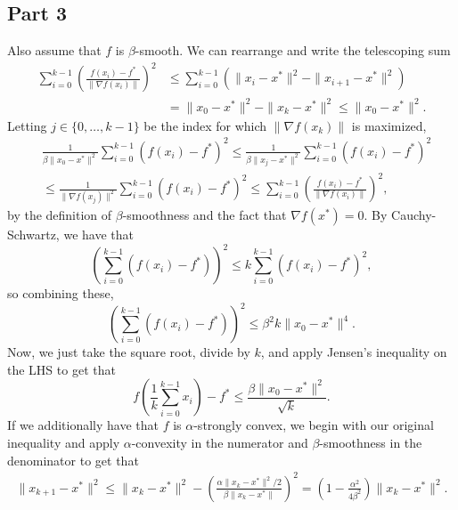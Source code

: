 \documentclass{article}
\begin{document}
\subsection{Part 3}
Also assume that $f$ is $\beta$-smooth.
We can rearrange and write the telescoping sum
\begin{align*}
\sum_{i=0}^{k-1}\left(\frac{f(x_i)-f^*}{\|\nabla f(x_i)\|}\right)^2&\leq\sum_{i=0}^{k-1}\left(\|x_{i}-x^*\|^2-\|x_{i+1}-x^*\|^2\right)\\&=
\|x_{0}-x^*\|^2-\|x_{k}-x^*\|^2\leq\|x_{0}-x^*\|^2.
\end{align*}
Letting $j\in\{0,\ldots,k-1\}$ be the index for which $\|\nabla f(x_k)\|$ is maximized,
\begin{align*}
&\frac{1}{\beta\|x_0-x^*\|^2}\sum_{i=0}^{k-1}\left(f(x_i)-f^*\right)^2\leq\frac{1}{\beta\|x_j-x^*\|^2}\sum_{i=0}^{k-1}\left(f(x_i)-f^*\right)^2\\&\leq\frac{1}{\|\nabla f(x_j)\|^2}\sum_{i=0}^{k-1}\left(f(x_i)-f^*\right)^2\leq\sum_{i=0}^{k-1}\left(\frac{f(x_i)-f^*}{\|\nabla f(x_i)\|}\right)^2,
\end{align*}
by the definition of $\beta$-smoothness and the fact that $\nabla f(x^*)=0$. By Cauchy-Schwartz, we have that 
\[
\left(\sum_{i=0}^{k-1}\left(f(x_i)-f^*\right)\right)^2\leq k\sum_{i=0}^{k-1}\left(f(x_i)-f^*\right)^2,
\] 
so combining these,
\[
\left(\sum_{i=0}^{k-1}\left(f(x_i)-f^*\right)\right)^2\leq\beta^2k\|x_0-x^*\|^4.
\]
Now, we just take the square root, divide by $k$, and apply Jensen's inequality on the LHS to get that
\[
f\left(\frac{1}{k}\sum_{i=0}^{k-1}x_i\right)-f^*\leq\frac{\beta\|x_0-x^*\|^2}{\sqrt{k}}.
\]
If we additionally have that $f$ is $\alpha$-strongly convex, we begin with our original inequality and apply $\alpha$-convexity in the numerator and $\beta$-smoothness in the denominator to get that 
\begin{align*}
\|x_{k+1}-x^*\|^2\leq\|x_k-x^*\|^2-\left(\frac{\alpha\|x_k-x^*\|^2/2}{\beta\|x_k-x^*\|}\right)^2=\left(1-\frac{\alpha^2}{4\beta^2}\right)\|x_k-x^*\|^2.
\end{align*}
\end{document}
